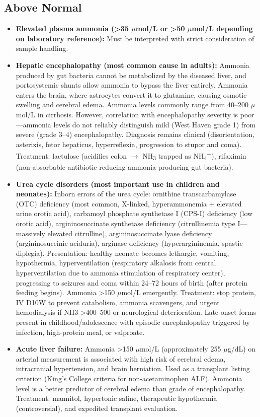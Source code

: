 \subsection*{Above Normal}
\begin{itemize}
  \item \textbf{Elevated plasma ammonia (>35 $\mu$mol/L or >50 $\mu$mol/L depending on laboratory reference):} Must be interpreted with strict consideration of sample handling.
  \item \textbf{Hepatic encephalopathy (most common cause in adults):} Ammonia produced by gut bacteria cannot be metabolized by the diseased liver, and portosystemic shunts allow ammonia to bypass the liver entirely. Ammonia enters the brain, where astrocytes convert it to glutamine, causing osmotic swelling and cerebral edema. Ammonia levels commonly range from 40--200 $\mu$mol/L in cirrhosis. However, correlation with encephalopathy severity is poor---ammonia levels do not reliably distinguish mild (West Haven grade 1) from severe (grade 3--4) encephalopathy. Diagnosis remains clinical (disorientation, asterixis, fetor hepaticus, hyperreflexia, progression to stupor and coma). Treatment: lactulose (acidifies colon $\rightarrow$ NH\textsubscript{3} trapped as NH\textsubscript{4}\textsuperscript{+}), rifaximin (non-absorbable antibiotic reducing ammonia-producing gut bacteria).
  \item \textbf{Urea cycle disorders (most important use in children and neonates):} Inborn errors of the urea cycle: ornithine transcarbamylase (OTC) deficiency (most common, X-linked, hyperammonemia + elevated urine orotic acid), carbamoyl phosphate synthetase I (CPS-I) deficiency (low orotic acid), argininosuccinate synthetase deficiency (citrullinemia type I---massively elevated citrulline), argininosuccinate lyase deficiency (argininosuccinic aciduria), arginase deficiency (hyperargininemia, spastic diplegia). Presentation: healthy neonate becomes lethargic, vomiting, hypothermia, hyperventilation (respiratory alkalosis from central hyperventilation due to ammonia stimulation of respiratory center), progressing to seizures and coma within 24--72 hours of birth (after protein feeding begins). Ammonia >150 $\mu$mol/L emergently. Treatment: stop protein, IV D10W to prevent catabolism, ammonia scavengers, and urgent hemodialysis if NH3 >400--500 or neurological deterioration. Late-onset forms present in childhood/adolescence with episodic encephalopathy triggered by infection, high-protein meal, or valproate.
  \item \textbf{Acute liver failure:} Ammonia >150 $\mu$mol/L (approximately 255 $\mu$g/dL) on arterial measurement is associated with high risk of cerebral edema, intracranial hypertension, and brain herniation. Used as a transplant listing criterion (King's College criteria for non-acetaminophen ALF). Ammonia level is a better predictor of cerebral edema than grade of encephalopathy. Treatment: mannitol, hypertonic saline, therapeutic hypothermia (controversial), and expedited transplant evaluation.

\end{itemize}
